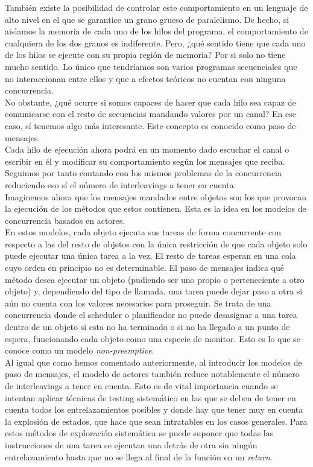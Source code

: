 También existe la posibilidad de controlar este comportamiento en un lenguaje de alto nivel en el que se garantice un grano grueso de paralelismo. De hecho, si aislamos la memoria de cada uno de los hilos del programa, el comportamiento de cualquiera de los dos granos es indiferente. Pero, ¿qué sentido tiene que cada uno de los hilos se ejecute con su propia región de memoria? Por si solo no tiene mucho sentido. Lo único que tendríamos son varios programas secuenciales que no interaccionan entre ellos y que a efectos teóricos no cuentan con ninguna concurrencia.\\

No obstante, ¿qué ocurre si somos capaces de hacer que cada hilo sea capaz de comunicarse con el resto de secuencias mandando valores por un canal? En ese caso, sí tenemos algo más interesante. Este concepto es conocido como paso de mensajes.\\

Cada hilo de ejecución ahora podrá en un momento dado escuchar el canal o escribir en él y modificar su comportamiento según los mensajes que reciba. Seguimos por tanto contando con los mismos problemas de la concurrencia reduciendo eso sí el número de interleavings a tener en cuenta.\\

Imaginemos ahora que los mensajes mandados entre objetos son los que provocan la ejecución de los métodos que estos contienen. Esta es la idea en los modelos de concurrencia basados en actores.\\

En estos modelos, cada objeto ejecuta sus tareas de forma concurrente con respecto a las del resto de objetos con la única restricción de que cada objeto solo puede ejecutar una única tarea a la vez. El resto de tareas esperan en una cola cuyo orden en principio no es determinable. El paso de mensajes indica qué método desea ejecutar un objeto (pudiendo ser uno propio o perteneciente a otro objeto) y, dependiendo del tipo de llamada, una tarea puede dejar paso a otra si aún no cuenta con los valores necesarios para proseguir. Se trata de una concurrencia donde el scheduler o planificador no puede desasignar a una tarea dentro de un objeto si esta no ha terminado o si no ha llegado a un punto de espera, funcionando cada objeto como una especie de monitor. Esto es lo que se conoce como un modelo \emph{non-preemptive}.\\

Al igual que como hemos comentado anteriormente, al introducir los modelos de paso de mensajes, el modelo de actores también reduce notablemente el número de interleavings a tener en cuenta. Esto es de vital importancia cuando se intentan aplicar técnicas de testing sistemático en las que se deben de tener en cuenta todos los entrelazamientos posibles y donde hay que tener muy en cuenta la explosión de estados, que hace que sean intratables en los casos generales. Para estos métodos de exploración sistemática se puede suponer que todas las instrucciones de una tarea se ejecutan una detrás de otra sin ningún entrelazamiento hasta que no se llega al final de la función en un \emph{return}.\\

